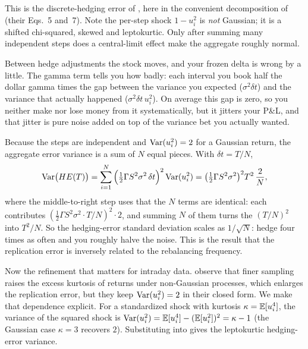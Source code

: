 This is the discrete-hedging error of \citet{BoyleEmanuel1980}, here in the convenient decomposition of \citet{AnagnouHodges2007} (their Eqs.~5 and~7). Note the per-step shock $1-u_i^2$ is \emph{not} Gaussian; it is a shifted chi-squared, skewed and leptokurtic. Only after summing many independent steps does a central-limit effect make the aggregate roughly normal.

\begin{intuition}
Between hedge adjustments the stock moves, and your frozen delta is wrong by a little. The gamma term tells you how badly: each interval you book half the dollar gamma times the gap between the variance you expected ($\sigma^2\delta t$) and the variance that actually happened ($\sigma^2\delta t\,u_i^2$). On average this gap is zero, so you neither make nor lose money from it systematically, but it jitters your P\&L, and that jitter is pure noise added on top of the variance bet you actually wanted.
\end{intuition}

Because the steps are independent and $\operatorname{Var}(u_i^2) = 2$ for a Gaussian return, the aggregate error variance is a sum of $N$ equal pieces. With $\delta t = T/N$,
\begin{equation}
\label{eq:ivrv:he-gaussian}
\operatorname{Var}\!\big(HE(T)\big) = \sum_{i=1}^{N}\Big(\tfrac{1}{2}\Gamma S^2\sigma^2\,\delta t\Big)^2 \operatorname{Var}(u_i^2)
= \big(\tfrac{1}{2}\Gamma S^2\sigma^2\big)^2 T^2\,\frac{2}{N},
\end{equation}
where the middle-to-right step uses that the $N$ terms are identical: each contributes $(\tfrac12\Gamma S^2\sigma^2\cdot T/N)^2\cdot 2$, and summing $N$ of them turns the $(T/N)^2$ into $T^2/N$. So the hedging-error standard deviation scales as $1/\sqrt{N}$: hedge four times as often and you roughly halve the noise. This is the \citet{BoyleEmanuel1980} result that the replication error is inversely related to the rebalancing frequency.

Now the refinement that matters for intraday data. \citet{AnagnouHodges2007} observe that finer sampling raises the excess kurtosis of returns under non-Gaussian processes, which enlarges the replication error, but they keep $\operatorname{Var}(u_i^2) = 2$ in their closed form. We make that dependence explicit. For a standardized shock with kurtosis $\kappa = \mathbb{E}[u_i^4]$, the variance of the squared shock is $\operatorname{Var}(u_i^2) = \mathbb{E}[u_i^4] - (\mathbb{E}[u_i^2])^2 = \kappa - 1$ (the Gaussian case $\kappa = 3$ recovers $2$). Substituting into  gives the leptokurtic hedging-error variance.

